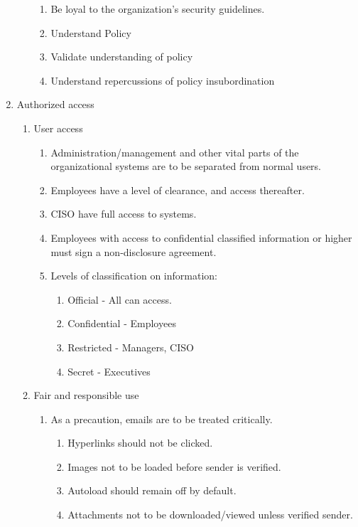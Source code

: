 \begin{enumerate}
\begin{enumerate}
    \begin{enumerate}
      \item Be loyal to the organization's security guidelines.
      \item Understand Policy
      \item Validate understanding of policy
      \item Understand repercussions of policy insubordination
    \end{enumerate}
  \end{enumerate}
  \item Authorized access
  \begin{enumerate}
    \item User access
    \begin{enumerate}
      \item Administration/management and other vital parts of the organizational systems are to be separated from normal users.
      \item Employees have a level of clearance, and access thereafter. 
      \item CISO have full access to systems.
      \item Employees with access to confidential classified information or higher must sign a non-disclosure agreement.
      \item Levels of classification on information:
      \begin{enumerate}
        \item Official - All can access.
        \item Confidential - Employees
        \item Restricted - Managers, CISO
        \item Secret - Executives
      \end{enumerate}
    \end{enumerate}
    \item Fair and responsible use
    \begin{enumerate}
      \item As a precaution, emails are to be treated critically.
      \begin{enumerate}
        \item Hyperlinks should not be clicked.
        \item Images not to be loaded before sender is verified.
        \item Autoload should remain off by default.
        \item Attachments not to be downloaded/viewed unless verified sender.

\end{enumerate}
\end{enumerate}
\end{enumerate}
\end{enumerate}
